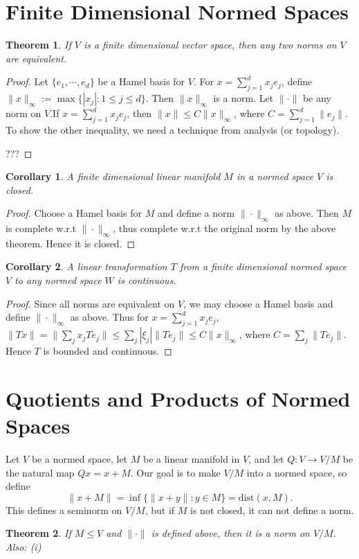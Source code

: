 \documentclass{article}
\newtheorem{theorem}{Theorem}[section]
\newtheorem{corollary}{Corollary}[theorem]
\theoremstyle{definition}
\begin{document}
\section{Finite Dimensional Normed Spaces}
\begin{theorem}
    If $V$ is a finite dimensional vector space, then any two norms on $V$ are equivalent.
\end{theorem}
\begin{proof}
    Let $\{ e_1,\cdots,e_d\}$ be a Hamel basis for $V$. For $x=\sum_{j=1}^{d}x_je_j$, define $\|x\|_\infty:=\max\{|x_j|:1\le j\le d\}$.
    Then $\|x\|_\infty$ is a norm. Let $\|\cdot\|$ be any norm on $V$.If $x=\sum_{j=1}^{d}x_je_j$, then $\|x\|\le C\|x\|_\infty$, 
    where $C=\sum_{j=1}^{d}\|e_j\|$. To show the other inequality, we need a technique from analysis (or topology).

    ???
\end{proof}
\begin{corollary}
    A finite dimensional linear manifold $M$ in a normed space $V$ is closed.
\end{corollary}
\begin{proof}
    Choose a Hamel basis for $M$ and define a norm $\|\cdot\|_\infty$ as above. Then $M$ is complete w.r.t $\|\cdot\|_\infty$,
    thus complete w.r.t the original norm by the above theorem. Hence it is closed.
\end{proof}
\begin{corollary}
    A linear transformation $T$ from a finite dimensional normed space $V$ to any normed space $W$ is continuous.
\end{corollary}
\begin{proof}
    Since all norms are equivalent on $V$, we may choose a Hamel basis and define $\|\cdot\|_\infty$ as above.
    Thus for $x=\sum_{j=1}^{d}x_je_j$, $\|Tx\|=\|\sum_j x_j Te_j\|\le \sum_j |\xi_j| \|Te_j\|\le C\|x\|_\infty$, where $C=\sum_j \|Te_j\|$.
    Hence $T$ is bounded and continuous.
\end{proof}

\section{Quotients and Products of Normed Spaces}
Let $V$ be a normed space, let $M$ be a linear manifold in $V$, and let $Q:V\to V/M$ be the natural map $Qx=x+M$.
Our goal is to make $V/M$ into a normed space, so define \[\|x+M\|=\inf \{\|x+y\|:y\in M\}=\text{dist}(x,M).\]
This defines a seminorm on $V/M$, but if $M$ is not closed, it can not define a norm.
\begin{theorem}
    If $M\le V$ and $\|\cdot\|$ is defined above, then it is a norm on $V/M$. Also:\newline 
    (i)
\end{theorem}
\end{document}
